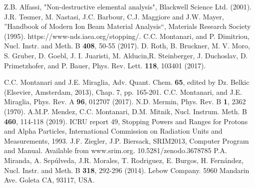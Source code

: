 \documentclass[aps,pra,reprint,groupedaddress]{revtex4-1}
\begin{document}
\begin{thebibliography}{00}
 Z.B. Alfassi, "Non-destructive elemental analysis", Blackwell Science Ltd. (2001).
 J.R. Tesmer, M. Nastasi, J.C. Barbour, C.J. Maggiore and J.W. Mayer, ''Handbook of Modern Ion Beam Material Analysis``, Materials Research Society (1995).
 https://www-nds.iaea.org/stopping/.
 C.C. Montanari, and P. Dimitriou, Nucl. Instr. and Meth. B \textbf{408},  50-55 (2017).
 D. Roth, B. Bruckner, M. V. Moro, S. Gruber, D. Goebl, J. I. Juaristi, M. Alducin,R. Steinberger, J. Duchoslav, D. Primetzhofer, and P. Bauer, Phys. Rev. Lett. \textbf{118}, 103401 (2017).

 C.C. Montanari and J.E. Miraglia, Adv. Quant. Chem. \textbf{65}, edited by Dz. Belkic (Elsevier, Amsterdam, 2013), Chap. 7, pp. 165-201.
 C.C. Montanari, and J.E. Miraglia, Phys. Rev. A \textbf{96}, 012707 (2017).
 N.D. Mermin, Phys. Rev. B \textbf{1}, 2362 (1970).
 A.M.P. Mendez, C.C. Montanari, D.M. Mitnik, Nucl. Instrum. Meth. B \textbf{460}, 114-118 (2019).
 ICRU report 49, Stopping Powers and Ranges for Protons and Alpha Particles, International Commission on Radiation Units and Measurements, 1993.
 J.F. Ziegler, J.P. Biersack, SRIM2013, Computer Program and Manual. Available from www.srim.org.
 10.5281/zenodo.3678785 %
 P.A. Miranda, A. Sep\'ulveda, J.R. Morales, T. Rodriguez, E. Burgos, H. Fern\'andez, Nucl. Instr. and Meth. B \textbf{318}, 292-296  (2014).
 Lebow Company. 5960 Mandarin Ave. Goleta CA, 93117, USA.


\end{thebibliography}
\end{document}
